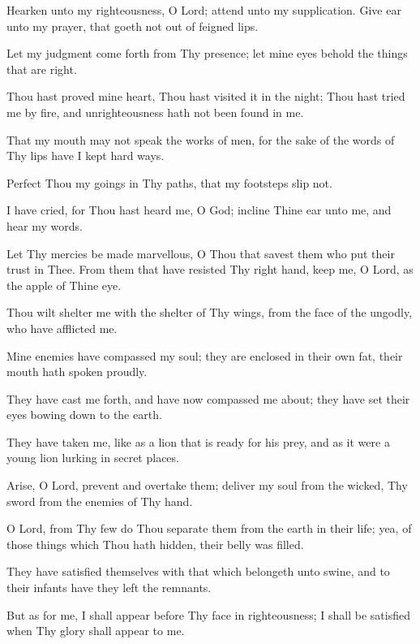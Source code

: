 Hearken unto my righteousness, O Lord; attend unto my supplication. Give ear unto my prayer, that goeth not out of feigned lips.

Let my judgment come forth from Thy presence; let mine eyes behold the things that are right.

Thou hast proved mine heart, Thou hast visited it in the night; Thou hast tried me by fire, and unrighteousness hath not been found in me.

That my mouth may not speak the works of men, for the sake of the words of Thy lips have I kept hard ways.

Perfect Thou my goings in Thy paths, that my footsteps slip not.

I have cried, for Thou hast heard me, O God; incline Thine ear unto me, and hear my words.

Let Thy mercies be made marvellous, O Thou that savest them who put their trust in Thee. From them that have resisted Thy right hand, keep me, O Lord, as the apple of Thine eye.

Thou wilt shelter me with the shelter of Thy wings, from the face of the ungodly, who have afflicted me.

Mine enemies have compassed my soul; they are enclosed in their own fat, their mouth hath spoken proudly.

They have cast me forth, and have now compassed me about; they have set their eyes bowing down to the earth.

They have taken me, like as a lion that is ready for his prey, and as it were a young lion lurking in secret places.

Arise, O Lord, prevent and overtake them; deliver my soul from the wicked, Thy sword from the enemies of Thy hand.

O Lord, from Thy few do Thou separate them from the earth in their life; yea, of those things which Thou hath hidden, their belly was filled.

They have satisfied themselves with that which belongeth unto swine, and to their infants have they left the remnants.

But as for me, I shall appear before Thy face in righteousness; I shall be satisfied when Thy glory shall appear to me.
